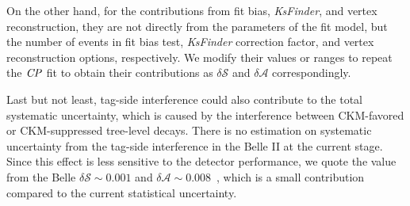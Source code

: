 On the other hand, for the contributions from fit bias, \textit{KsFinder}, and vertex reconstruction, they are not directly from the parameters of the fit model, but the number of events in fit bias test, \textit{KsFinder} correction factor, and vertex reconstruction options, respectively. We modify their values or ranges to repeat the $\it{CP}$ fit to obtain their contributions as $\delta \mathcal{S}$ and $\delta \mathcal{A}$ correspondingly. 

Last but not least, tag-side interference could also contribute to the total systematic uncertainty, which is caused by the interference between CKM-favored or CKM-suppressed tree-level decays.  There is no estimation on systematic uncertainty from the tag-side interference in the Belle II at the current stage. Since this effect is less sensitive to the detector performance, we quote the value from the Belle $\delta \mathcal{S} \sim 0.001$ and $\delta \mathcal{A} \sim 0.008$~\cite{yosuke2011measurement},  which is a small contribution compared to the current statistical uncertainty.

